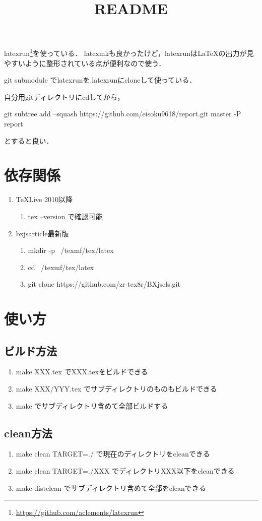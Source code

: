 \documentclass[a4paper,xelatex,ja=standard,twocolumn]{bxjsarticle}
\title{README}
\begin{document}
\maketitle

latexrun\footnote{\url{https://github.com/aclements/latexrun}}を使っている．
latexmkも良かったけど，latexrunは{\LaTeX}の出力が見やすいように整形されている点が便利なので使う．

git submodule でlatexrunを.latexrunにcloneして使っている．

自分用gitディレクトリにcdしてから，

git subtree add --squash https://github.com/eisoku9618/report.git master -P report

とすると良い．

\section{依存関係}
\begin{enumerate}
  \item {\TeX}Live 2010以降
    \begin{enumerate}
      \item tex --version で確認可能
    \end{enumerate}
  \item bxjsarticle最新版
    \begin{enumerate}
      \item mkdir -p ~/texmf/tex/latex
      \item cd ~/texmf/tex/latex
      \item git clone https://github.com/zr-tex8r/BXjscls.git
    \end{enumerate}
\end{enumerate}

\section{使い方}
\subsection{ビルド方法}
\begin{enumerate}
  \item make XXX.tex でXXX.texをビルドできる
  \item make XXX/YYY.tex でサブディレクトリのものもビルドできる
  \item make でサブディレクトリ含めて全部ビルドする
\end{enumerate}
\subsection{clean方法}
\begin{enumerate}
  \item make clean TARGET=./ で現在のディレクトリをcleanできる
  \item make clean TARGET=./XXX でディレクトリXXX以下をcleanできる
  \item make distclean でサブディレクトリ含めて全部をcleanできる
\end{enumerate}
\end{document}
